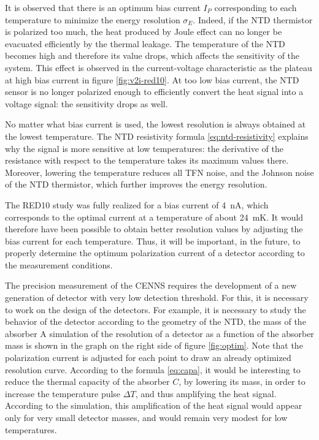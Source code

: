 It is observed that there is an optimum bias current $I_P$ corresponding to each temperature to minimize the energy resolution $\sigma_E$. Indeed, if the NTD thermistor is polarized too much, the heat produced by Joule effect can no longer be evacuated efficiently by the thermal leakage. The temperature of the NTD becomes high and therefore its value drops, which affects the sensitivity of the system. This effect is observed in the current-voltage characteristic as the plateau at high bias current in figure \ref{fig:v2i-red10}. At too low bias current, the NTD sensor is no longer polarized enough to efficiently convert the heat signal into a voltage signal: the sensitivity drops as well.

No matter what bias current is used, the lowest resolution is always obtained at the lowest temperature. The NTD resistivity formula \ref{eq:ntd-resistivity} explains why the signal is more sensitive at low temperatures: the derivative of the resistance with respect to the temperature takes its maximum values there. Moreover, lowering the temperature reduces all TFN noise, and the Johnson noise of the NTD thermistor, which further improves the energy resolution.

The RED10 study was fully realized for a bias current of \SI{4}{\nano\ampere}, which corresponds to the optimal current at a temperature of about \SI{24}{\milli\kelvin}. It would therefore have been possible to obtain better resolution values by adjusting the bias current for each temperature. Thus, it will be important, in the future, to properly determine the optimum polarization current of a detector according to the measurement conditions.

The precision measurement of the CENNS requires the development of a new generation of detector with very low detection threshold. For this, it is necessary to work on the design of the detectors. For example, it is necessary to study the behavior of the detector according to the geometry of the NTD, the mass of the absorber
A simulation of the resolution of a detector as a function of the absorber mass is shown in the graph on the right side of figure \ref{fig:optim}. Note that the polarization current is adjusted for each point to draw an already optimized resolution curve. According to the formula \ref{eq:capa}, it would be interesting to reduce the thermal capacity of the absorber $C$, by lowering its mass, in order to increase the temperature pulse $\Delta T$, and thus amplifying the heat signal. According to the simulation, this amplification of the heat signal would appear only for very small detector masses, and would remain very modest for low temperatures. 

